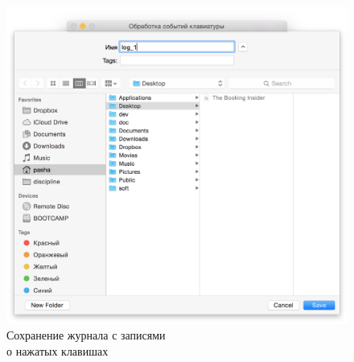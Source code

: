 \begin{figure}[h!]
  \centering
  \includegraphics[width=130mm]{pic/save_process.png}
  \caption{Сохранение журнала с записями \\ о нажатых клавишах}
  \label{pic:save_process}
\end{figure}

\pagebreak
